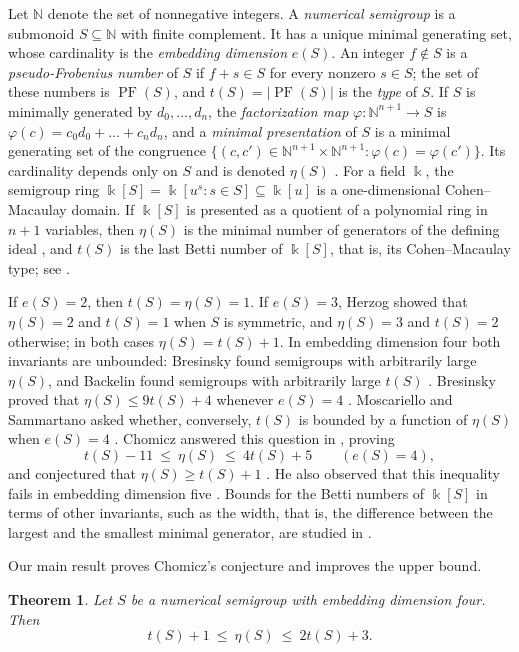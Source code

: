 \documentclass{amsart}
\newtheorem{theorem}{Theorem}[section]
\theoremstyle{definition}
\theoremstyle{remark}
\numberwithin{equation}{section}
\newcommand{\N}{\mathbb{N}}
\newcommand{\kk}{\Bbbk}
\DeclareMathOperator{\PF}{PF}
\begin{document}
Let $\N$ denote the set of nonnegative integers. A \emph{numerical semigroup} is a submonoid $S\subseteq\N$ with finite complement. It has a unique minimal generating set, whose cardinality is the \emph{embedding dimension} $e(S)$. An integer $f\notin S$ is a \emph{pseudo-Frobenius number} of $S$ if $f+s\in S$ for every nonzero $s\in S$; the set of these numbers is $\PF(S)$, and $t(S)=|\PF(S)|$ is the \emph{type} of $S$. If $S$ is minimally generated by $d_0,\dots,d_n$, the \emph{factorization map} $\varphi\colon\N^{n+1}\to S$ is $\varphi(c)=c_0d_0+\dots+c_nd_n$, and a \emph{minimal presentation} of $S$ is a minimal generating set of the congruence $\{(c,c')\in\N^{n+1}\times\N^{n+1} : \varphi(c)=\varphi(c')\}$. Its cardinality depends only on $S$ and is denoted $\eta(S)$ \cite{Ros96,RGS09}. For a field $\kk$, the semigroup ring $\kk[S]=\kk[u^s : s\in S]\subseteq\kk[u]$ is a one-dimensional Cohen--Macaulay domain. If $\kk[S]$ is presented as a quotient of a polynomial ring in $n+1$ variables, then $\eta(S)$ is the minimal number of generators of the defining ideal \cite{Her70}, and $t(S)$ is the last Betti number of $\kk[S]$, that is, its Cohen--Macaulay type; see \cite{RGS09,Sta18}.

If $e(S)=2$, then $t(S)=\eta(S)=1$. If $e(S)=3$, Herzog \cite{Her70} showed that $\eta(S)=2$ and $t(S)=1$ when $S$ is symmetric, and $\eta(S)=3$ and $t(S)=2$ otherwise; in both cases $\eta(S)=t(S)+1$. In embedding dimension four both invariants are unbounded: Bresinsky \cite{Bre75a} found semigroups with arbitrarily large $\eta(S)$, and Backelin found semigroups with arbitrarily large $t(S)$ \cite[p.~75]{FGH87}. Bresinsky proved that $\eta(S)\le 9t(S)+4$ whenever $e(S)=4$ \cite[Theorem~7]{Bre88}. Moscariello and Sammartano asked whether, conversely, $t(S)$ is bounded by a function of $\eta(S)$ when $e(S)=4$ \cite[Problem~25]{MS25}. Chomicz answered this question in \cite[Theorem~1.4]{Cho26}, proving
\[
t(S)-11\ \le\ \eta(S)\ \le\ 4t(S)+5 \qquad (e(S)=4),
\]
and conjectured that $\eta(S)\ge t(S)+1$ \cite[Conjecture~5.1]{Cho26}. He also observed that this inequality fails in embedding dimension five \cite[Remark~5.2]{Cho26}. Bounds for the Betti numbers of $\kk[S]$ in terms of other invariants, such as the width, that is, the difference between the largest and the smallest minimal generator, are studied in \cite{CMS24}.

Our main result proves Chomicz's conjecture and improves the upper bound.

\begin{theorem}\label{thm:main}
Let $S$ be a numerical semigroup with embedding dimension four. Then
\[
t(S)+1\ \le\ \eta(S)\ \le\ 2t(S)+3 .
\]
\end{theorem}
\end{document}
